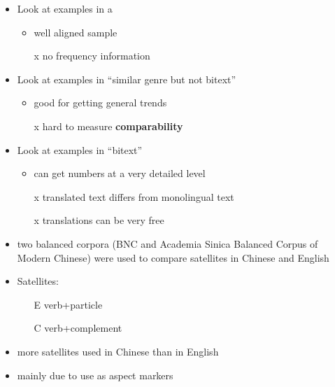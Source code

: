 \documentclass[a4paper,landscape,headrule,footrule,xetex]{foils}
\begin{document}

\begin{itemize}
\item Look at examples in a 
  \begin{itemize}
  \item well aligned sample
  \item[x] no frequency information
  \end{itemize}
\item Look at examples in   ``similar genre but not bitext''
  \begin{itemize}
  \item good for getting general trends
  \item[x] hard to measure \textbf{comparability}
  \end{itemize}
\item Look at examples in   ``bitext''
  \begin{itemize}
  \item can get numbers at a very detailed level
  \item[x] translated text differs from monolingual text
  \item[x] translations can be very free
  \end{itemize}
\end{itemize}





\begin{itemize}
\item two balanced corpora (BNC and Academia Sinica Balanced Corpus of Modern
Chinese) were used to compare satellites in Chinese and English

\item Satellites:
  \begin{itemize}
  \item[E]  verb+particle 
  \item[C]  verb+complement 
  \end{itemize}
\item more satellites used in Chinese than in English
\item mainly due to use as aspect markers
\end{itemize}
\end{document}
